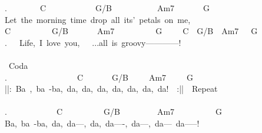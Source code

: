 {.\ \ \ \ \ \ \ \ C\ \ \ \ \ \ \ \ \ \ \ \ G/B\ \ \ \ \ \ \ \ \ \ \ Am7\ \ \ \ \ \ \ G\\
Let\ the\ morning\ time\ drop\ all\ its'\ petals\ on\ me,\\
C\ \ \ \ \ \ \ \ \ \ G/B\ \ \ \ \ \ \ Am7\ \ \ \ \ \ \ \ \ \ G\ \ \ \ \ C\ \ G/B\ \ Am7\ \ \ G\\
.\ \ \ Life,\ I\ love\ you,\ \ \ ...all\ is\ groovy------------!\\
\\
\lbrack\ Coda\rbrack\\
.\ \ \ \ \ \ \ \ \ \ \ \ \ \ \ \ \ C\ \ \ \ \ \ \ G/B\ \ \ \ \ Am7\ \ \ \ \ G\\
||:\ Ba\ ,\ ba\ -ba,\ da,\ da,\ da,\ da,\ da,\ da,\ da!\ \ :||\ \lbrack\ Repeat\rbrack\\
\\
.\ \ \ \ \ \ \ \ \ \ \ \ C\ \ \ \ \ \ \ \ \ \ G/B\ \ \ \ \ \ \ \ \ Am7\ \ \ \ \ \ \ \ \ \ G\ \\
Ba,\ ba\ -ba,\ da,\ da---,\ da,\ da----,\ da---,\ da---\ da-----!}
